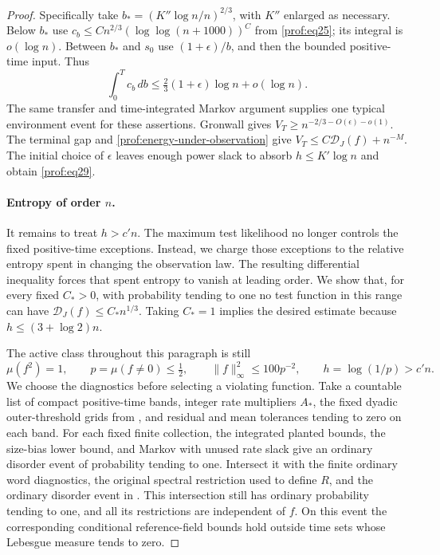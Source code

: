 \begin{proof}
Specifically take
$b_*=(K''\log n/n)^{2/3}$, with $K''$ enlarged as necessary.  Below $b_*$
use $c_b\le Cn^{2/3}(\log\log(n+1000))^C$ from
\eqref{prof:eq25}; its integral is $o(\log n)$.  Between $b_*$ and $s_0$
use $(1+\epsilon)/b$, and then the bounded positive-time input.  Thus
\[
 \int_0^T c_b\,db
     \le\tfrac23(1+\epsilon)\log n+o(\log n).
\]
The same transfer and time-integrated Markov argument supplies one typical
environment event for these assertions.  Gronwall gives
$V_T\ge n^{-2/3-O(\epsilon)-o(1)}$.  The terminal gap and
\eqref{prof:energy-under-observation} give
$V_T\le C\mathcal D_J(f)+n^{-M}$. The initial choice of $\epsilon$ leaves
enough power slack to absorb $h\le K'\log n$ and obtain
\eqref{prof:eq29}.

\paragraph{Entropy of order $n$.}
It remains to treat $h>c'n$. The maximum test likelihood no longer
controls the fixed positive-time exceptions. Instead, we charge those
exceptions to the relative entropy spent in changing the observation law.
The resulting differential inequality forces that spent entropy to
vanish at leading order. We show that, for
every fixed $C_*>0$, with probability tending to one no test function in
this range can have $\mathcal D_J(f)\le C_*n^{1/3}$.
Taking $C_*=1$ implies the desired estimate because
$h\le(3+\log2)n$.

The active class throughout this paragraph is still
\[
 \mu(f^2)=1,\qquad p=\mu(f\ne0)\le\tfrac12,\qquad
 \|f\|_\infty^2\le100p^{-2},\qquad h=\log(1/p)>c'n.
\]
We choose the diagnostics before selecting a violating function.
Take a countable list of compact positive-time bands, integer rate
multipliers \(A_*\), the fixed dyadic outer-threshold grids from
, and residual and mean tolerances
tending to zero on each band. For each fixed finite collection,
the integrated planted bounds, the size-bias lower bound, and
Markov with unused rate slack give an ordinary disorder event of
probability tending to one. Intersect it with the finite ordinary word
diagnostics, the original spectral restriction used to define \(R\), and
the ordinary disorder event in . This
intersection still has ordinary probability tending to one, and all its
restrictions are independent of \(f\). On this event the corresponding
conditional reference-field bounds hold outside time sets whose
Lebesgue measure tends to zero.


\end{proof}
